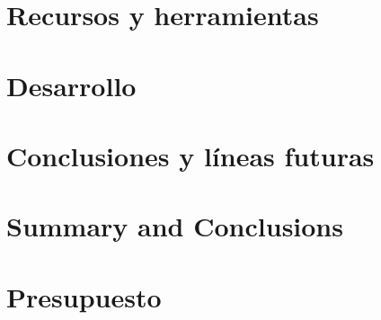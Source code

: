 \documentclass[spanish,a4paper,14pt,oneside]{extreport}
\begin{document}
\chapter{Recursos y herramientas}
\label{chapter:recursos}




\chapter{Desarrollo}
\label{chapter:desarrollo}



\newpage{\pagestyle{empty}}
\thispagestyle{empty}

\chapter{Conclusiones y líneas futuras}
\label{chapter:conclusiones}



\newpage{\pagestyle{empty}}
\thispagestyle{empty}

\chapter{Summary and Conclusions }
\label{chapter:summary}



\newpage{\pagestyle{empty}}
\thispagestyle{empty}

\chapter{Presupuesto}
\label{chapter:presupuesto}



\end{document}
